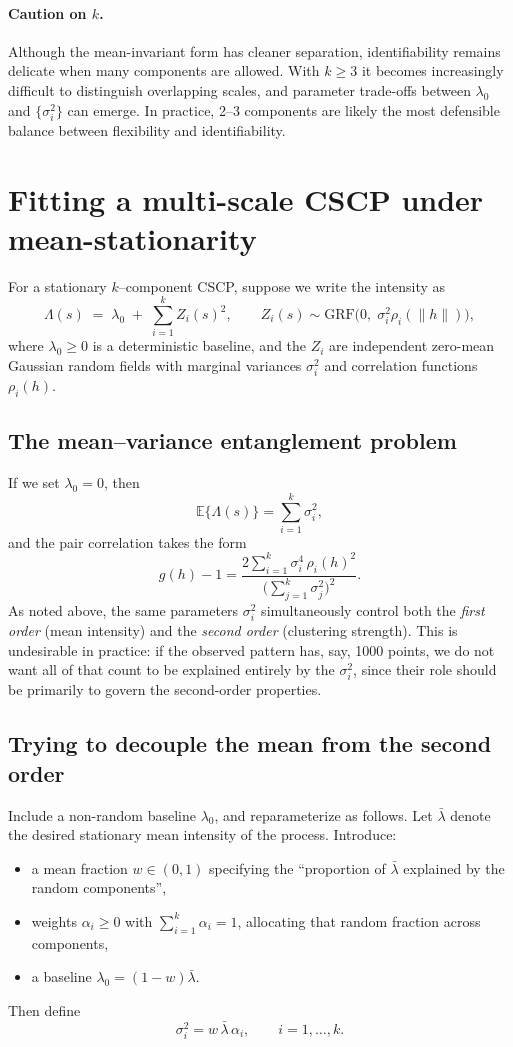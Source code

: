 \documentclass[11pt]{article}
\begin{document}
\paragraph{Caution on $k$.}
Although the mean-invariant form has cleaner separation, identifiability remains delicate when many components are allowed. With $k\geq 3$ it becomes increasingly difficult to distinguish overlapping scales, and parameter trade-offs between $\lambda_0$ and $\{\sigma_i^2\}$ can emerge. In practice, 2--3 components are likely the most defensible balance between flexibility and identifiability.




\section{Fitting a multi-scale CSCP under mean-stationarity}

For a stationary $k$--component CSCP, suppose we write the intensity  as
\[
\Lambda(s) \;=\; \lambda_0 \;+\; \sum_{i=1}^k Z_i(s)^2,
\qquad
Z_i(s)\sim \text{GRF}\big(0,\;\sigma_i^2 \rho_i(\|h\|)\big),
\]
where $\lambda_0 \ge 0$ is a deterministic baseline, and the $Z_i$ are independent zero-mean Gaussian random fields with marginal variances $\sigma_i^2$ and correlation functions $\rho_i(h)$.  

\subsection{The mean--variance entanglement problem}

If we set $\lambda_0=0$, then
\[
\mathbb E\{\Lambda(s)\} = \sum_{i=1}^k \sigma_i^2,
\]
and the pair correlation takes the form
\[
g(h)-1 = \frac{2\sum_{i=1}^k \sigma_i^4\,\rho_i(h)^2}{\big(\sum_{j=1}^k \sigma_j^2\big)^2}.
\]
As noted above, the same parameters $\sigma_i^2$ simultaneously control both the \emph{first order} (mean intensity) and the \emph{second order} (clustering strength).  
This is undesirable in practice: if the observed pattern has, say, 1000 points, we do not want all of that count to be explained entirely by the $\sigma_i^2$, since their role should be primarily to govern the second-order properties.

\subsection{Trying to decouple the mean from the second order}

Include a non-random baseline $\lambda_0$, and reparameterize as follows. Let $\bar\lambda$ denote the desired stationary mean intensity of the process. Introduce:
\begin{itemize}
	\item a mean fraction $w \in (0,1)$ specifying the ``proportion of $\bar\lambda$ explained by the random components'',
	\item weights $\alpha_i \ge 0$ with $\sum_{i=1}^k \alpha_i = 1$, allocating that random fraction across components,
	\item a baseline $\lambda_0 = (1-w)\bar\lambda$.
\end{itemize}
Then define
\[
\sigma_i^2 = w\,\bar\lambda\,\alpha_i, \qquad i=1,\ldots,k.
\]
\end{document}
